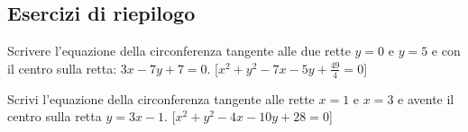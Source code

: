 

\subsection{Esercizi di riepilogo}

\begin{esercizio}\label{ese:}
Scrivere l'equazione della circonferenza tangente alle due rette 
\(y=0\) e \(y=5\) e con il centro sulla retta: \(3x-7y+7=0\).
\hfill[\(x^2+y^2-7x-5y+\frac{49}{4}=0\)]
\end{esercizio}

\begin{esercizio}\label{ese:}
Scrivi l’equazione della circonferenza tangente alle rette 
\(x=1\) e \(x=3\) e avente il centro sulla retta \(y=3x-1\).
\hfill[\(x^2+y^2-4x-10y+28=0\)]
\end{esercizio}

